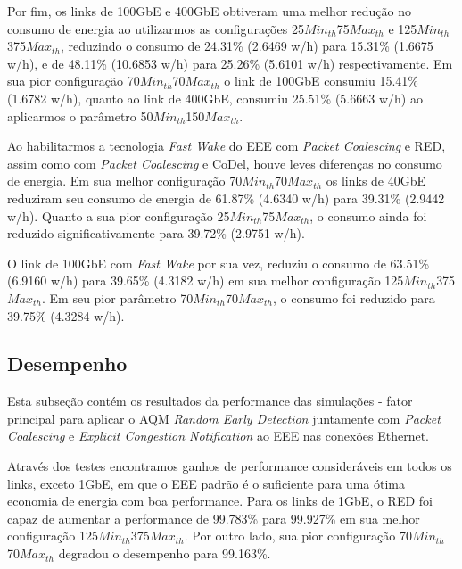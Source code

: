Por fim, os links de 100GbE e 400GbE obtiveram uma melhor redução no consumo de energia ao utilizarmos as configurações 25{$\mathit{Min}_\mathit{th}$}75{$\mathit{Max}_\mathit{th}$} e 125{$\mathit{Min}_\mathit{th}$}375{$\mathit{Max}_\mathit{th}$}, reduzindo o consumo de 24.31\% (2.6469 w/h) para 15.31\% (1.6675 w/h), e de 48.11\% (10.6853 w/h) para 25.26\% (5.6101 w/h) respectivamente. Em sua pior configuração 70{$\mathit{Min}_\mathit{th}$}70{$\mathit{Max}_\mathit{th}$} o link de 100GbE consumiu 15.41\% (1.6782 w/h), quanto ao link de 400GbE, consumiu 25.51\% (5.6663 w/h) ao aplicarmos o parâmetro 50{$\mathit{Min}_\mathit{th}$}150{$\mathit{Max}_\mathit{th}$}.

Ao habilitarmos a tecnologia \emph{Fast Wake} do EEE com \emph{Packet Coalescing} e RED, assim como com \emph{Packet Coalescing} e CoDel, houve leves diferenças no consumo de energia. Em sua melhor configuração 70{$\mathit{Min}_\mathit{th}$}70{$\mathit{Max}_\mathit{th}$} os links de 40GbE reduziram seu consumo de energia de 61.87\% (4.6340 w/h) para 39.31\% (2.9442 w/h). Quanto a sua pior configuração 25{$\mathit{Min}_\mathit{th}$}75{$\mathit{Max}_\mathit{th}$}, o consumo ainda foi reduzido significativamente para 39.72\% (2.9751 w/h).

O link de 100GbE com \emph{Fast Wake} por sua vez, reduziu o consumo de 63.51\% (6.9160 w/h) para 39.65\% (4.3182 w/h) em sua melhor configuração 125{$\mathit{Min}_\mathit{th}$}375{$\mathit{Max}_\mathit{th}$}. Em seu pior parâmetro 70{$\mathit{Min}_\mathit{th}$}70{$\mathit{Max}_\mathit{th}$}, o consumo foi reduzido para 39.75\% (4.3284 w/h).

\subsection{Desempenho}

Esta subseção contém os resultados da performance das simulações - fator principal para aplicar o AQM \emph{Random Early Detection} juntamente com \emph{Packet Coalescing} e \emph{Explicit Congestion Notification} ao EEE nas conexões Ethernet.

Através dos testes encontramos ganhos de performance consideráveis em todos os links, exceto 1GbE, em que o EEE padrão é o suficiente para uma ótima economia de energia com boa performance. Para os links de 1GbE, o RED foi capaz de aumentar a performance de 99.783\% para 99.927\% em sua melhor configuração 125{$\mathit{Min}_\mathit{th}$}375{$\mathit{Max}_\mathit{th}$}. Por outro lado, sua pior configuração 70{$\mathit{Min}_\mathit{th}$}70{$\mathit{Max}_\mathit{th}$} degradou o desempenho para 99.163\%.

